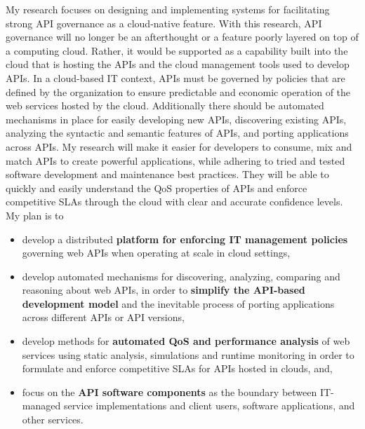 My research focuses on designing and implementing systems for facilitating 
strong API governance as a cloud-native feature. With this research, API
governance will no longer be an afterthought or a feature poorly layered on
top of a computing cloud. Rather, it would be supported as a capability built into
the cloud that is hosting the APIs and the cloud management
tools used to develop APIs. 
In a cloud-based IT context, APIs must be governed by
policies that are defined by the organization to ensure predictable and
economic operation of the web services hosted by the cloud. Additionally
there should be automated mechanisms in place for easily developing new
APIs, discovering existing APIs, analyzing the syntactic and semantic features
of APIs, and porting applications across APIs. My research will make 
it easier for developers to consume, mix and match APIs to create powerful
applications, while adhering to tried and tested software development and 
maintenance best practices. They will be able to quickly and easily understand
the QoS properties of APIs and enforce competitive SLAs through the cloud
with clear and accurate confidence levels. My plan is to
\begin{itemize}
\item develop a distributed {\bf platform for enforcing IT 
management policies} governing
web APIs when operating at scale in cloud settings,
\item develop automated mechanisms for discovering, analyzing, comparing and reasoning
about web APIs, in order to {\bf simplify the API-based development model} and
the inevitable process of porting applications across different APIs or API versions,
\item develop methods for {\bf automated QoS and performance analysis} of web services
using static analysis, simulations and runtime monitoring in order
to formulate and enforce competitive SLAs for APIs hosted in clouds, and,
\item focus on the {\bf API software components} as the boundary between 
IT-managed
service implementations and client users, software applications, and other
services.
\end{itemize}

